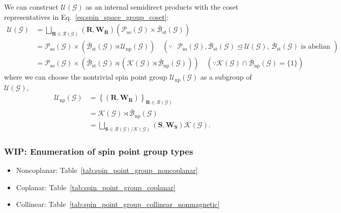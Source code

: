 We can construct $\mathcal{U}(\mathcal{G})$ as an internal semidirect products with the coset representatives in Eq.~\eqref{eq:spin_space_group_coset}:
\begin{align}
  \mathcal{U}(\mathcal{G})
    &= \bigsqcup_{ \bm{R} \in \mathcal{R}(\mathcal{G}) } (\bm{R}, \bm{W}_{\bm{R}}) \left( \mathcal{P}_{\mathrm{so}}(\mathcal{G}) \times \bar{\mathcal{B}}_{\mathrm{st}}(\mathcal{G}) \right) \nonumber \\
    &= \mathcal{P}_{\mathrm{so}}(\mathcal{G})
        \times \left(
          \bar{\mathcal{B}}_{\mathrm{st}}(\mathcal{G})
          \rtimes
          \mathcal{U}_{\mathrm{np}}(\mathcal{G})
         \right)
       \quad (\because \mbox{ $\mathcal{P}_{\mathrm{so}}(\mathcal{G}), \bar{\mathcal{B}}_{\mathrm{st}}(\mathcal{G}) \trianglelefteq \mathcal{U}(\mathcal{G})$, $\bar{\mathcal{B}}_{\mathrm{st}}(\mathcal{G})$ is abelian } ) \nonumber \\
    &= \mathcal{P}_{\mathrm{so}}(\mathcal{G})
        \times \left(
          \bar{\mathcal{B}}_{\mathrm{st}}(\mathcal{G})
          \rtimes
          \left(
            \mathcal{K}(\mathcal{G})
            \rtimes
            \bar{\mathcal{B}}_{\mathrm{np}}(\mathcal{G})
          \right)
         \right)
      \quad (\because \mathcal{K}(\mathcal{G}) \cap \bar{\mathcal{B}}_{\mathrm{np}}(\mathcal{G}) = \{ 1 \})
\end{align}
where we can choose the nontrivial spin point group $\mathcal{U}_{\mathrm{np}}(\mathcal{G})$ as a subgroup of $\mathcal{U}(\mathcal{G})$,
\begin{align}
  \mathcal{U}_{\mathrm{np}}(\mathcal{G})
    &= \left\{ (\bm{R}, \bm{W}_{\bm{R}}) \right\}_{ \bm{R} \in \mathcal{R}(\mathcal{G}) } \nonumber \\
    &= \mathcal{K}(\mathcal{G}) \rtimes \bar{\mathcal{B}}_{\mathrm{np}}(\mathcal{G}) \nonumber \\
    &= \bigsqcup_{ \bm{S} \in \mathcal{R}(\mathcal{G}) / \mathcal{K}(\mathcal{G}) } (\bm{S}, \bm{W}_{\bm{S}}) \mathcal{K}(\mathcal{G}).
\end{align}


\subsubsection{WIP: Enumeration of spin point group types}

\begin{itemize}
  \item Noncoplanar: Table~\ref{tab:spin_point_group_noncoplanar}
  \item Coplanar: Table~\ref{tab:spin_point_group_coplanar}
  \item Collinear: Table~\ref{tab:spin_point_group_collinear_nonmagnetic}
\end{itemize}

